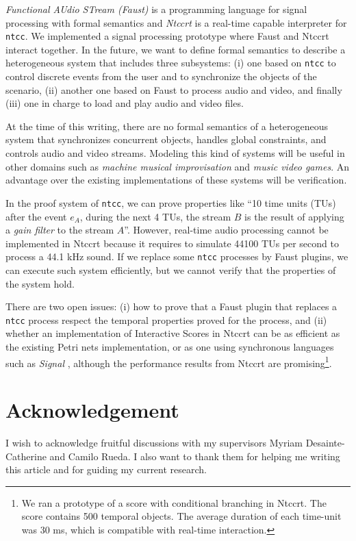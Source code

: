 \documentclass[]{lipics-iclp}
\theoremstyle{plain}\newtheorem{mainthm}[thm]{Main Theorem}
\theoremstyle{definition}\newtheorem{crucialdef}[thm]{Crucial Definition}
\begin{document}
\textit{Functional AUdio STream (Faust)} \cite{faust} is a programming language
for signal processing with formal semantics and \textit{Ntccrt} \cite{ntccrt} is a real-time capable interpreter for \texttt{ntcc}.
We implemented a signal processing prototype where Faust and Ntccrt interact together.
In the future, we want to define formal semantics to describe a heterogeneous system that includes three subsystems: (i) one based on \texttt{ntcc} to control
discrete events from the user and to synchronize the objects of the scenario, (ii)
another one based on Faust to process audio and video, and finally (iii) one in charge
to load and play audio and video files. 

At the time of this writing, there are no formal semantics of a heterogeneous system that synchronizes concurrent objects, handles global constraints, and controls audio and video streams. Modeling this kind of systems will be useful in other domains such as \textit{machine musical improvisation} \cite{Assayag-using} and \textit{music video games}. An advantage over the existing implementations of these systems will be verification.

In the proof system of \texttt{ntcc}, we can prove properties like  
``10 time units (TUs) after the event $e_A$, during the next 4 TUs, the stream $B$ is the result of applying a \textit{gain filter} to the stream $A$''. However, real-time audio processing cannot be implemented in Ntccrt because it requires to simulate 44100 TUs per second to process a 44.1 kHz sound. If we replace some \texttt{ntcc} processes by Faust plugins, we can execute such system efficiently, but we cannot verify that the properties of the system hold. 

There are two open issues: (i) how to 
prove that a Faust plugin that replaces a \texttt{ntcc} process respect the temporal properties proved for the process, and (ii) whether an implementation of Interactive Scores in Ntccrt can be as efficient as the existing Petri nets implementation, or as one using synchronous languages such as \textit{Signal} \cite{signal}, although the performance results from Ntccrt are promising\footnote{We ran a prototype of a score with conditional branching in Ntccrt. The score contains 500 temporal objects. The average duration of each time-unit was 30 ms, which is compatible with real-time interaction.}.

\section*{Acknowledgement}
I wish to acknowledge fruitful discussions with my supervisors Myriam Desainte-Catherine and Camilo Rueda.
I also want to thank them for helping me writing this article and for guiding my current research.
\end{document}

